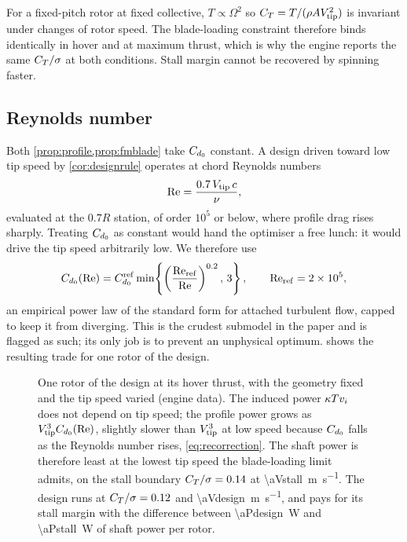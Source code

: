 \begin{remark}
For a fixed-pitch rotor at fixed collective, $T \propto \Omega^2$ so
$C_T = T/(\rho A V_{\mathrm{tip}}^2)$ is invariant under changes of rotor speed. The
blade-loading constraint therefore binds identically in hover and at maximum
thrust, which is why the engine reports the same $C_T/\sigma$ at both
conditions. Stall margin cannot be recovered by spinning faster.
\end{remark}

\subsection{Reynolds number}

Both \cref{prop:profile,prop:fmblade} take $C_{d_0}$ constant. A design driven
toward low tip speed by \cref{cor:designrule} operates at chord Reynolds
numbers
\begin{equation}
  \mathrm{Re} = \frac{0.7\,V_{\mathrm{tip}}\, c}{\nu} ,
  \label{eq:reynolds}
\end{equation}
evaluated at the $0.7R$ station, of order $10^5$ or below, where profile drag
rises sharply. Treating $C_{d_0}$ as constant would hand the optimiser a free
lunch: it would drive the tip speed arbitrarily low. We therefore use
\begin{equation}
  C_{d_0}(\mathrm{Re}) = C_{d_0}^{\mathrm{ref}}
    \min\!\left\{\left(\frac{\mathrm{Re}_{\mathrm{ref}}}{\mathrm{Re}}
    \right)^{0.2},\,3\right\},
  \qquad \mathrm{Re}_{\mathrm{ref}} = 2\times 10^5 ,
  \label{eq:recorrection}
\end{equation}
an empirical power law of the standard form for attached turbulent flow, capped
to keep it from diverging. This is the crudest submodel in the paper and is
flagged as such; its only job is to prevent an unphysical optimum.
 shows the resulting trade for one rotor of the design.

\begin{figure}[tbp]
\centering

\caption{One rotor of the design at its hover thrust, with the geometry fixed
and the tip speed varied (engine data). The induced power $\kappa Tv_i$ does
not depend on tip speed; the profile power grows as $V_{\mathrm{tip}}^3C_{d_0}(\mathrm{Re})$,
slightly slower than $V_{\mathrm{tip}}^3$ at low speed because $C_{d_0}$ falls as the
Reynolds number rises, \cref{eq:recorrection}. The shaft power is therefore
least at the lowest tip speed the blade-loading limit admits, on the stall
boundary $C_T/\sigma = 0.14$ at \SI{\aVstall}{\metre\per\second}. The
design runs at $C_T/\sigma = 0.12$ and \SI{\aVdesign}{\metre\per\second},
and pays for its stall margin with the difference between
\SI{\aPdesign}{\watt} and \SI{\aPstall}{\watt} of shaft power per rotor.}
\label{fig:tipspeed}
\end{figure}

